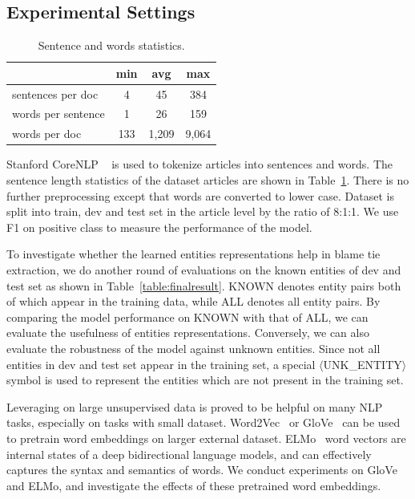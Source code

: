 \documentclass[letterpaper]{article}
\begin{document}
\subsection{Experimental Settings}

\begin{table}[t!]
\centering
\begin{tabular}{l c c c} 
 \hline
 &{\bf min} & {\bf avg}  &{\bf max} \\ 
 \hline\hline
sentences per doc & 4 & 45 & 384 \\ 
words per sentence & 1 & 26 & 159 \\
words per doc & 133 & 1,209 & 9,064 \\
 \hline
\end{tabular}
\caption{Sentence and words statistics.}
\label{table:lengthstatistic}
\end{table}

Stanford CoreNLP ~\cite{manning-EtAl:2014:P14-5} is used to tokenize articles into sentences and words. The sentence length statistics of the dataset articles are shown in Table~\ref{table:lengthstatistic}. There is no further preprocessing except that words are converted to lower case. Dataset is split into train, dev and test set in the article level by the ratio of 8:1:1. We use F1 on positive class to measure the performance of the model.

To investigate whether the learned entities representations help in blame tie extraction, we do another round of evaluations on the known entities of dev and test set as shown in Table~\ref{table:finalresult}. KNOWN denotes entity pairs both of which appear in the training data, while ALL denotes all entity pairs. By comparing the model performance on KNOWN with that of ALL, we can evaluate the usefulness of entities representations. Conversely, we can also evaluate the robustness of the model against unknown entities. Since not all entities in dev and test set appear in the training set, a special $\langle$UNK\_ENTITY$\rangle$ symbol is used to represent the entities which are not present in the training set.

Leveraging on large unsupervised data is proved to be helpful on many NLP tasks, especially on tasks with small dataset. Word2Vec~\cite{DBLP:journals/corr/abs-1301-3781} or GloVe~\cite{pennington2014glove} can be used to pretrain word embeddings on larger external dataset. ELMo~\cite{Peters:2018} word vectors are internal states of a deep bidirectional language models, and can effectively captures the syntax and semantics of words. We conduct experiments on GloVe and ELMo, and investigate the effects of these pretrained word embeddings.
\end{document}
